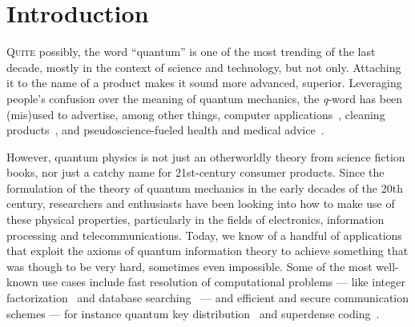 \chapter{Introduction}
\label{chp:intro}

\lettrine{Q}{uite} possibly, the word ``quantum'' is one of the most trending of the last decade,
mostly in the context of science and technology, but not only. Attaching it to the name of a product
makes it sound more advanced, superior. Leveraging people's confusion over the meaning of quantum
mechanics, the \emph{q}-word has been (mis)used to advertise, among other things, computer
applications~\cite{firefox_quantum}, cleaning products~\cite{finish_quantum}, and
pseudoscience-fueled health and medical advice~\cite{milgrom_2002_patient}.

However, quantum physics is not just an otherworldly theory from science fiction books, nor just a
catchy name for 21st-century consumer products. Since the formulation of the theory of quantum
mechanics in the early decades of the 20th century, researchers and enthusiasts have been looking
into how to make use of these physical properties, particularly in the fields of electronics,
information processing and telecommunications. Today, we know of a handful of applications that
exploit the axioms of quantum information theory to achieve something that was though to be very
hard, sometimes even impossible. Some of the most well-known use cases include fast resolution of
computational problems --- like integer factorization~\cite{shor_1994_algorithms} and database
searching~\cite{grover_1996_search} --- and efficient and secure communication schemes --- for
instance quantum key distribution~\cite{bennett_2014_bb84, ekert_1991_e91} and superdense
coding~\cite{bennett_1992_communication}.

